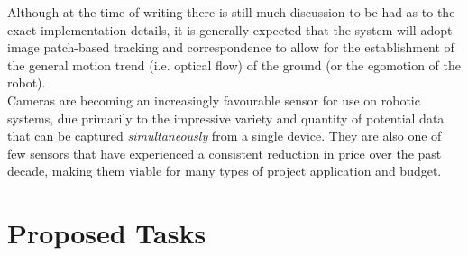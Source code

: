 \documentclass[10pt,fleqn,twoside]{article}
\begin{document}
Although at the time of writing there is still much discussion to be had as to the exact implementation details, it is generally expected that the system will adopt image patch-based tracking and correspondence to allow for the establishment of the general motion trend (i.e. optical flow) of the ground (or the egomotion of the robot). \\

Cameras are becoming an increasingly favourable sensor for use on robotic systems, due primarily to the impressive variety and quantity of potential data that can be captured \textit{simultaneously} from a single device. They are also one of few sensors that have experienced a consistent reduction in price over the past decade, making them viable for many types of project application and budget.



\section{Proposed Tasks}

\end{document}
